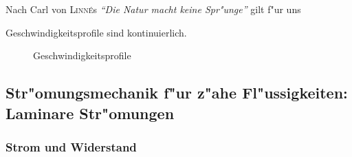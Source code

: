 



\bigskip

Nach Carl von \textsc{Linné}s \emph{"`Die Natur macht keine Spr"unge"'}
gilt f"ur uns
\begin{Wichtig}
   Geschwindigkeitsprofile sind kontinuierlich.
\end{Wichtig}

\begin{figure}
   \centering
\caption[Geschwindigkeitsprofile von
Flüssigkeiten]{Geschwindigkeitsprofile}
   \label{abb_geschwindigkeitsprofile}
\end{figure}



\subsection{Str"omungsmechanik f"ur z"ahe Fl"ussigkeiten: Laminare Str"omungen}
\label{kap_stromungsmechanik-fur-zahe-flussigkeiten}

\subsubsection{Strom und Widerstand}
\label{kap_strom-und-widerstand}



